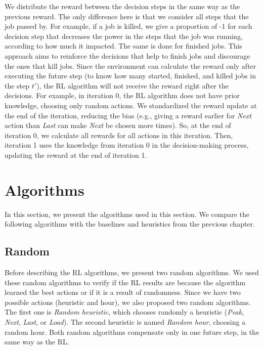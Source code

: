 We distribute the reward between the decision steps in the same way as the previous reward. The only difference here is that we consider all steps that the job passed by. For example, if a job is killed, we give a proportion of -1 for each decision step that decreases the power in the steps that the job was running, according to how much it impacted. The same is done for finished jobs. This approach aims to reinforce the decisions that help to finish jobs and discourage the ones that kill jobs. 
Since the environment can calculate the reward only after executing the future step (to know how many started, finished, and killed jobs in the step $t'$), the RL algorithm will not receive the reward right after the decisions. For example, in iteration 0, the RL algorithm does not have prior knowledge, choosing only random actions. We standardized the reward update at the end of the iteration, reducing the bias (e.g., giving a reward earlier for \emph{Next} action than \emph{Last} can make \emph{Next} be chosen more times). So, at the end of iteration 0, we calculate all rewards for all actions in this iteration. Then, iteration 1 uses the knowledge from iteration 0 in the decision-making process, updating the reward at the end of iteration 1.

\section{Algorithms}
\label{sec:RL_algos}
In this section, we present the algorithms used in this section. We compare the following algorithms with the baselines and heuristics from the previous chapter.

\subsection{Random}
Before describing the RL algorithms, we present two random algorithms. We used these random algorithms to verify if the RL results are because the algorithm learned the best actions or if it is a result of randomness. Since we have two possible actions (heuristic and hour), we also proposed two random algorithms. The first one is \emph{Random heuristic}, which chooses randomly a heuristic (\emph{Peak}, \emph{Next}, \emph{Last}, or \emph{Load}). The second heuristic is named \emph{Random hour}, choosing a random hour. Both random algorithms compensate only in one future step, in the same way as the RL.

